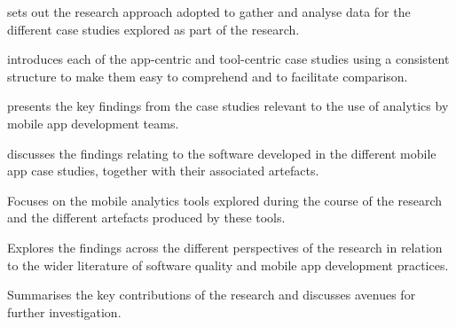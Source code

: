  sets out the research approach adopted to gather and analyse data for the different case studies explored as part of the research.

 introduces each of the app-centric and tool-centric case studies using a consistent structure to make them easy to comprehend and to facilitate comparison.

 presents the key findings from the case studies relevant to the use of analytics by mobile app development teams.

 discusses the findings relating to the software developed in the different mobile app case studies, together with their associated artefacts.

 Focuses on the mobile analytics tools explored during the course of the research and the different artefacts produced by these tools.

 Explores the findings across the different perspectives of the research in relation to the wider literature of software quality and mobile app development practices.

 Summarises the key contributions of the research and discusses avenues for further investigation.


